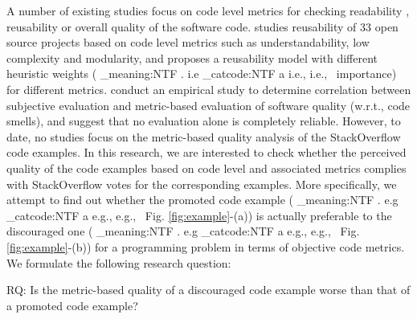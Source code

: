 \documentclass[conference]{IEEEtran}
\makeatletter
\newcommand\latinabbrev[1]{
  \peek_meaning:NTF . {%
    #1\@}%
  { \peek_catcode:NTF a {%
      #1., \@ }%
    {#1., \@}}}
\def\eg{\latinabbrev{e.g}}
\def\ie{\latinabbrev{i.e}}
\makeatother
\begin{document}
A number of existing studies focus on code level metrics for checking readability \cite{readability}, reusability \cite{reusability} or overall quality \cite{lochmann} of the software code. \citet{reusability} studies reusability of 33 open source projects based on code level metrics such as understandability, low complexity and modularity, and proposes 
a reusability model with different heuristic weights (\ie\ importance) for different metrics. \citet{subjective} conduct an empirical study to determine correlation between subjective evaluation and metric-based evaluation of software quality (w.r.t., code smells), and suggest that no evaluation alone is completely reliable. However, to date, no studies focus on the metric-based quality analysis of the StackOverflow code examples. In this research, we are interested to check whether the perceived quality of the code examples based on code level and associated metrics complies with StackOverflow votes for the corresponding examples. More specifically, we attempt to find out whether the promoted code example (\eg\ Fig. \ref{fig:example}-(a)) is actually preferable to the discouraged one (\eg\ Fig. \ref{fig:example}-(b)) for a programming problem in terms of objective code metrics. We formulate the following research question:
\begin{framed}
\noindent
RQ: Is the metric-based quality of a discouraged code example worse than that of a promoted code example?
\end{framed}
\end{document}
